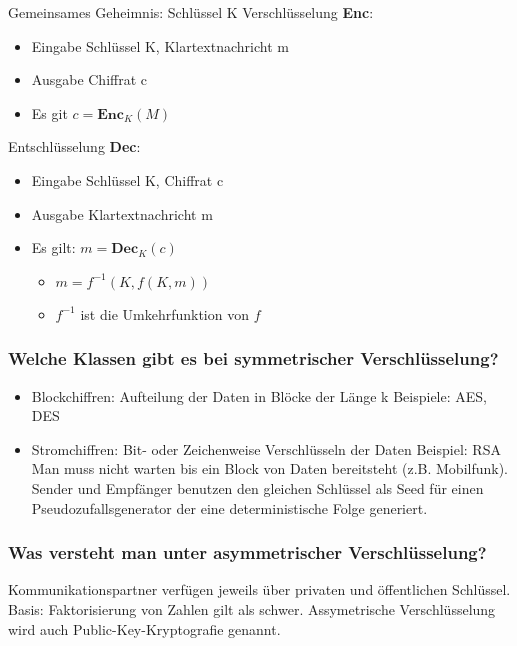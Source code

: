 	Gemeinsames Geheimnis: Schlüssel K
	Verschlüsselung \textbf{Enc}:
		\begin{itemize}
			\item Eingabe Schlüssel K, Klartextnachricht m
			\item Ausgabe Chiffrat c
			\item Es git $c=\textbf{Enc}_K(M)$
		\end{itemize}
	Entschlüsselung \textbf{Dec}:
		\begin{itemize}
			\item Eingabe Schlüssel K, Chiffrat c
			\item Ausgabe Klartextnachricht m
			\item Es gilt: $m = \textbf{Dec}_K(c)$
				\begin{itemize}
					\item $m = f^{-1}(K,f(K,m))$
					\item $f^{-1}$ ist die Umkehrfunktion von $f$
				\end{itemize}
		\end{itemize}
		
	\subsubsection{Welche Klassen gibt es bei symmetrischer Verschlüsselung?}
	\begin{itemize}
		\item Blockchiffren: Aufteilung der Daten in Blöcke der Länge k
		Beispiele: AES, DES
		
		\item Stromchiffren: Bit- oder Zeichenweise Verschlüsseln der Daten
		Beispiel: RSA
		Man muss nicht warten bis ein Block von Daten bereitsteht (z.B. Mobilfunk). Sender und Empfänger benutzen den gleichen Schlüssel als Seed für einen Pseudozufallsgenerator der eine deterministische Folge generiert.
	\end{itemize}
	
	\subsubsection{Was versteht man unter asymmetrischer Verschlüsselung?}
	Kommunikationspartner verfügen jeweils über privaten und öffentlichen Schlüssel. Basis: Faktorisierung von Zahlen gilt als schwer. Assymetrische Verschlüsselung wird auch Public-Key-Kryptografie genannt.
	
